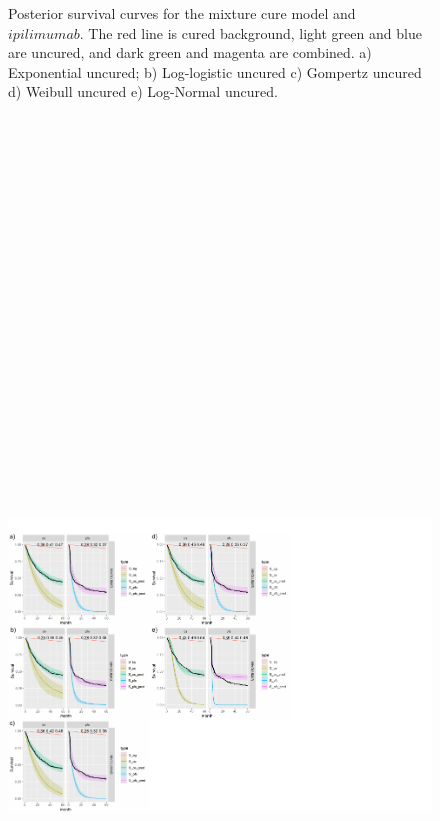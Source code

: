 \documentclass[
]{article}
\begin{document}
\begin{figure}
{}

\caption{\label{fig:IPI}Posterior survival curves for the mixture cure model and $ipilimumab$. The red line is cured background, light green and blue are uncured, and dark green and magenta are combined. a) Exponential uncured; b) Log-logistic uncured c) Gompertz uncured d) Weibull uncured e) Log-Normal uncured.}\label{fig:unnamed-chunk-3}
\end{figure}

\begin{figure}

{\centering \includegraphics[width=25cm,height=40cm]{Check_mate_analysis_files/figure-latex/unnamed-chunk-4-1} 

}
\end{figure}
\end{document}
